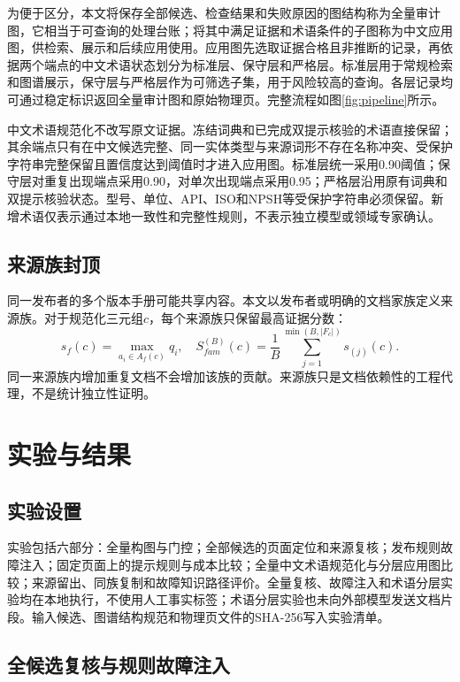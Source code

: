 \documentclass[conference,a4paper]{IEEEtran}
\begin{document}
为便于区分，本文将保存全部候选、检查结果和失败原因的图结构称为全量审计图，它相当于可查询的处理台账；将其中满足证据和术语条件的子图称为中文应用图，供检索、展示和后续应用使用。应用图先选取证据合格且非推断的记录，再依据两个端点的中文术语状态划分为标准层、保守层和严格层。标准层用于常规检索和图谱展示，保守层与严格层作为可筛选子集，用于风险较高的查询。各层记录均可通过稳定标识返回全量审计图和原始物理页。完整流程如图\ref{fig:pipeline}所示。

中文术语规范化不改写原文证据。冻结词典和已完成双提示核验的术语直接保留；其余端点只有在中文候选完整、同一实体类型与来源词形不存在名称冲突、受保护字符串完整保留且置信度达到阈值时才进入应用图。标准层统一采用0.90阈值；保守层对重复出现端点采用0.90，对单次出现端点采用0.95；严格层沿用原有词典和双提示核验状态。型号、单位、API、ISO和NPSH等受保护字符串必须保留。新增术语仅表示通过本地一致性和完整性规则，不表示独立模型或领域专家确认。

\subsection{来源族封顶}

同一发布者的多个版本手册可能共享内容。本文以发布者或明确的文档家族定义来源族。对于规范化三元组$c$，每个来源族只保留最高证据分数：
\begin{equation}
s_f(c)=\max_{a_i\in A_f(c)}q_i,\quad
S_{fam}^{(B)}(c)=\frac{1}{B}\sum_{j=1}^{\min(B,|F_c|)}s_{(j)}(c).
\label{eq:family}
\end{equation}
同一来源族内增加重复文档不会增加该族的贡献。来源族只是文档依赖性的工程代理，不是统计独立性证明。

\section{实验与结果}

\subsection{实验设置}

实验包括六部分：全量构图与门控；全部候选的页面定位和来源复核；发布规则故障注入；固定页面上的提示规则与成本比较；全量中文术语规范化与分层应用图比较；来源留出、同族复制和故障知识路径评价。全量复核、故障注入和术语分层实验均在本地执行，不使用人工事实标签；术语分层实验也未向外部模型发送文档片段。输入候选、图谱结构规范和物理页文件的SHA-256写入实验清单。

\subsection{全候选复核与规则故障注入}
\end{document}
